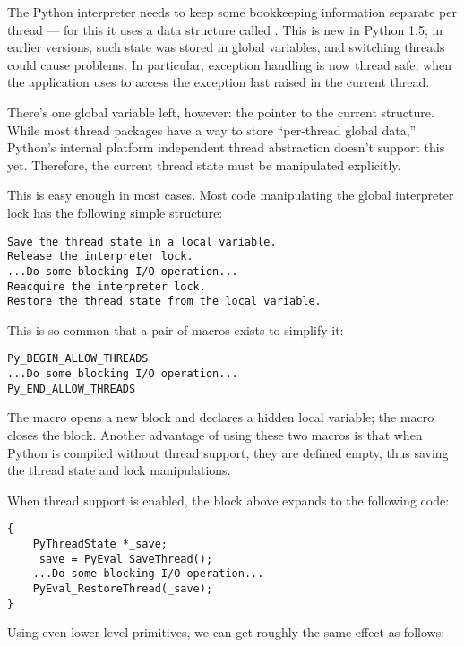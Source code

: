 \documentclass{manual}
\begin{document}
The Python interpreter needs to keep some bookkeeping information
separate per thread --- for this it uses a data structure called
.  This is new in Python 1.5; in earlier versions,
such state was stored in global variables, and switching threads could
cause problems.  In particular, exception handling is now thread safe,
when the application uses  to access the
exception last raised in the current thread.

There's one global variable left, however: the pointer to the current
 structure.  While most thread packages have a way
to store ``per-thread global data,'' Python's internal platform
independent thread abstraction doesn't support this yet.  Therefore,
the current thread state must be manipulated explicitly.

This is easy enough in most cases.  Most code manipulating the global
interpreter lock has the following simple structure:

\begin{verbatim}
Save the thread state in a local variable.
Release the interpreter lock.
...Do some blocking I/O operation...
Reacquire the interpreter lock.
Restore the thread state from the local variable.
\end{verbatim}

This is so common that a pair of macros exists to simplify it:

\begin{verbatim}
Py_BEGIN_ALLOW_THREADS
...Do some blocking I/O operation...
Py_END_ALLOW_THREADS
\end{verbatim}

The  macro opens a new block and declares
a hidden local variable; the  macro closes
the block.  Another advantage of using these two macros is that when
Python is compiled without thread support, they are defined empty,
thus saving the thread state and lock manipulations.

When thread support is enabled, the block above expands to the
following code:

\begin{verbatim}
{
    PyThreadState *_save;
    _save = PyEval_SaveThread();
    ...Do some blocking I/O operation...
    PyEval_RestoreThread(_save);
}
\end{verbatim}

Using even lower level primitives, we can get roughly the same effect
as follows:
\end{document}
